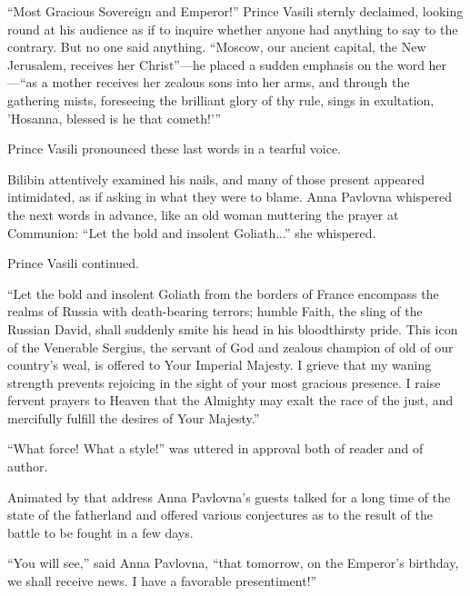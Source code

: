 ``Most Gracious Sovereign and Emperor!'' Prince Vasili sternly
declaimed, looking round at his audience as if to inquire whether
anyone had anything to say to the contrary. But no one said
anything. ``Moscow, our ancient capital, the New Jerusalem,
receives her Christ''---he placed a sudden emphasis on the word
her---``as a mother receives her zealous sons into her arms, and
through the gathering mists, foreseeing the brilliant glory of
thy rule, sings in exultation, 'Hosanna, blessed is he that
cometh!'{}''

Prince Vasili pronounced these last words in a tearful voice.

Bilibin attentively examined his nails, and many of those present
appeared intimidated, as if asking in what they were to
blame. Anna Pavlovna whispered the next words in advance, like an
old woman muttering the prayer at Communion: ``Let the bold and
insolent Goliath...'' she whispered.

Prince Vasili continued.

``Let the bold and insolent Goliath from the borders of France
encompass the realms of Russia with death-bearing terrors; humble
Faith, the sling of the Russian David, shall suddenly smite his
head in his bloodthirsty pride. This icon of the Venerable
Sergius, the servant of God and zealous champion of old of our
country's weal, is offered to Your Imperial Majesty. I grieve
that my waning strength prevents rejoicing in the sight of your
most gracious presence. I raise fervent prayers to Heaven that
the Almighty may exalt the race of the just, and mercifully
fulfill the desires of Your Majesty.''

``What force! What a style!'' was uttered in approval both of
reader and of author.

Animated by that address Anna Pavlovna's guests talked for a long
time of the state of the fatherland and offered various
conjectures as to the result of the battle to be fought in a few
days.

``You will see,'' said Anna Pavlovna, ``that tomorrow, on the
Emperor's birthday, we shall receive news. I have a favorable
presentiment!''


